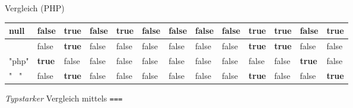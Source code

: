 \begin{bonus}{Vergleich (PHP)}
{\begin{tabular}{|T||T|T|T|T|T|T|T|T|T|T|T|T|}
            \hline
            null  & false         & \textbf{true} & false         & \textbf{true} & false         & false         & false         & false         & \textbf{true} & \textbf{true} & false         & \textbf{true} \\
            \hline
            []    & false         & \textbf{true} & false         & false         & false         & false         & false         & false         & \textbf{true} & \textbf{true} & false         & false         \\
            \hline
            "php" & \textbf{true} & false         & false         & false         & false         & false         & false         & false         & false         & false         & \textbf{true} & false         \\
            \hline
            " \ " & false         & \textbf{true} & false         & false         & false         & false         & false         & false         & \textbf{true} & false         & false         & \textbf{true} \\
            \hline
        \end{tabular}
    }

    \emph{Typstarker} Vergleich mittels \texttt{===}


\end{bonus}
